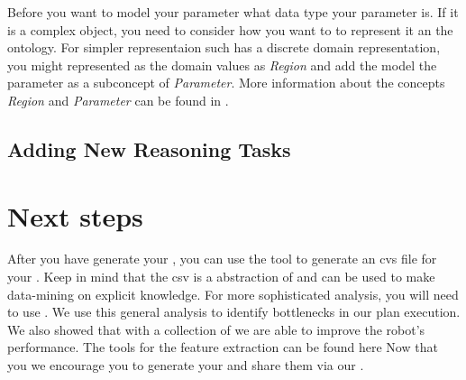 Before you want to model your parameter what data type your parameter is.
If it is a complex object, you need to consider how you want to to represent it an the ontology.
For simpler representaion such has a discrete domain representation, you might represented as the domain values as \textit{Region} and add the model the parameter as a subconcept of \textit{Parameter}.
More information about the concepts \textit{Region} and \textit{Parameter} can be found in .


\subsection{Adding New Reasoning Tasks}



\section{Next steps}
After you have generate your \neem, you can use the tool  to generate an cvs file for your \neem.
Keep in mind that the csv is a abstraction of \neemnar and can be used to make data-mining on explicit knowledge.
For more sophisticated analysis, you will need to use \knowrob. 
We use this general analysis to identify bottlenecks in our plan execution.
We also showed that with a collection of \neems we are able to improve the robot's performance.
The tools for the feature extraction can be found here 
Now that you we encourage you to generate your \neems and share them via our \neemhub.


